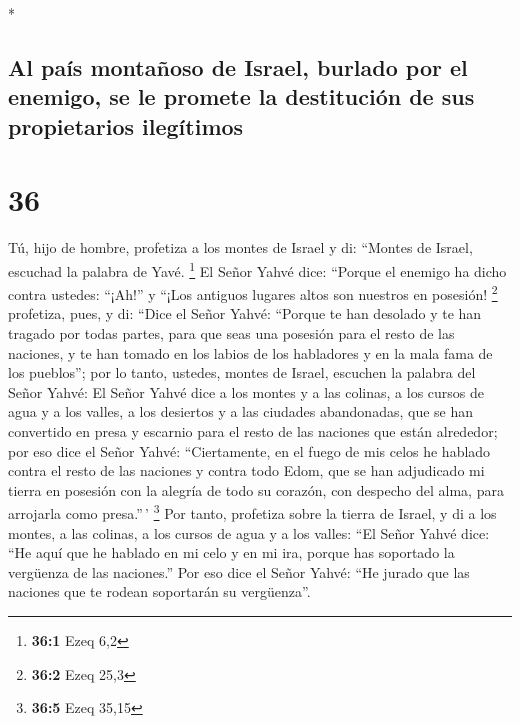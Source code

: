 \begin{paracol}{2}
\begin{otherlanguage}{english}
\end{otherlanguage}

\switchcolumn[0]*

\hypertarget{al-pauxeds-montauxf1oso-de-israel-burlado-por-el-enemigo-se-le-promete-la-destituciuxf3n-de-sus-propietarios-ileguxedtimos}{%
\subsection{Al país montañoso de Israel, burlado por el enemigo, se le
promete la destitución de sus propietarios
ilegítimos}\label{al-pauxeds-montauxf1oso-de-israel-burlado-por-el-enemigo-se-le-promete-la-destituciuxf3n-de-sus-propietarios-ileguxedtimos}}

\hypertarget{section-70}{%
\section{36}\label{section-70}}

 Tú, hijo de hombre, profetiza a los montes de Israel y
di: ``Montes de Israel, escuchad la palabra de Yavé. \footnote{\textbf{36:1}
  Ezeq 6,2}  El Señor Yahvé dice: ``Porque el enemigo ha
dicho contra ustedes: ``¡Ah!'' y ``¡Los antiguos lugares altos son
nuestros en posesión! \footnote{\textbf{36:2} Ezeq 25,3} 
profetiza, pues, y di: ``Dice el Señor Yahvé: ``Porque te han desolado y
te han tragado por todas partes, para que seas una posesión para el
resto de las naciones, y te han tomado en los labios de los habladores y
en la mala fama de los pueblos'';  por lo tanto, ustedes,
montes de Israel, escuchen la palabra del Señor Yahvé: El Señor Yahvé
dice a los montes y a las colinas, a los cursos de agua y a los valles,
a los desiertos y a las ciudades abandonadas, que se han convertido en
presa y escarnio para el resto de las naciones que están alrededor;
 por eso dice el Señor Yahvé: ``Ciertamente, en el fuego
de mis celos he hablado contra el resto de las naciones y contra todo
Edom, que se han adjudicado mi tierra en posesión con la alegría de todo
su corazón, con despecho del alma, para arrojarla como presa.''\,'
\footnote{\textbf{36:5} Ezeq 35,15}  Por tanto, profetiza
sobre la tierra de Israel, y di a los montes, a las colinas, a los
cursos de agua y a los valles: ``El Señor Yahvé dice: ``He aquí que he
hablado en mi celo y en mi ira, porque has soportado la vergüenza de las
naciones.''  Por eso dice el Señor Yahvé: ``He jurado que
las naciones que te rodean soportarán su vergüenza''.


\end{paracol}
